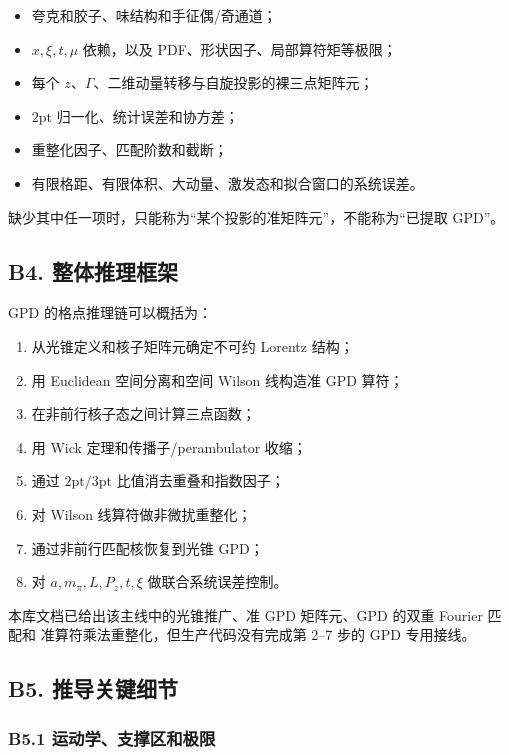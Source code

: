 \documentclass[UTF8]{ctexart}
\begin{document}
\begin{itemize}
\item 夸克和胶子、味结构和手征偶/奇通道；
\item $x,\xi,t,\mu$ 依赖，以及 PDF、形状因子、局部算符矩等极限；
\item 每个 $z$、$\Gamma$、二维动量转移与自旋投影的裸三点矩阵元；
\item $2\mathrm{pt}$ 归一化、统计误差和协方差；
\item 重整化因子、匹配阶数和截断；
\item 有限格距、有限体积、大动量、激发态和拟合窗口的系统误差。
\end{itemize}

缺少其中任一项时，只能称为“某个投影的准矩阵元”，不能称为“已提取 GPD”。

\subsection{B4. 整体推理框架}

GPD 的格点推理链可以概括为：

\begin{enumerate}
\item 从光锥定义和核子矩阵元确定不可约 Lorentz 结构；
\item 用 Euclidean 空间分离和空间 Wilson 线构造准 GPD 算符；
\item 在非前行核子态之间计算三点函数；
\item 用 Wick 定理和传播子/perambulator 收缩；
\item 通过 $2\mathrm{pt}/3\mathrm{pt}$ 比值消去重叠和指数因子；
\item 对 Wilson 线算符做非微扰重整化；
\item 通过非前行匹配核恢复到光锥 GPD；
\item 对 $a,m_\pi,L,P_z,t,\xi$ 做联合系统误差控制。
\end{enumerate}

本库文档已给出该主线中的光锥推广、准 GPD 矩阵元、GPD 的双重 Fourier 匹配和
准算符乘法重整化，但生产代码没有完成第 2--7 步的 GPD 专用接线。 \cite{D1,D2,D6,D7,P1}

\subsection{B5. 推导关键细节}

\subsubsection{B5.1 运动学、支撑区和极限}
\end{document}
